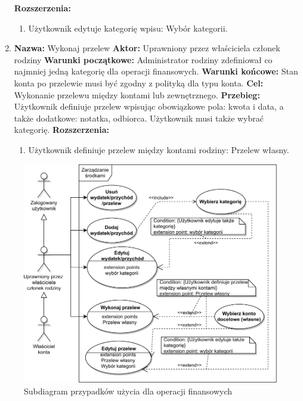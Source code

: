 \begin{enumerate}[labelwidth=1em,label=\arabic*.]
    \textbf{Rozszerzenia: } 
    \begin{enumerate}[label=\alph*)]
        \item Użytkownik edytuje kategorię wpisu: Wybór kategorii.
    \end{enumerate}
\item \textbf{Nazwa:} Wykonaj przelew \newline
    \textbf{Aktor:} Uprawniony przez właściciela członek rodziny \newline
    \textbf{Warunki początkowe:} Administrator rodziny zdefiniował co najmniej jedną kategorię dla operacji finansowych. \newline
    \textbf{Warunki końcowe:} Stan konta po przelewie musi być zgodny z polityką dla typu konta. \newline
    \textbf{Cel:} Wykonanie przelewu między kontami lub zewnętrznego. \newline
    \textbf{Przebieg:} Użytkownik definiuje przelew wpisując obowiązkowe pola: kwota i data, a także dodatkowe: notatka, odbiorca. Użytkownik musi także wybrać kategorię. \newline
    \textbf{Rozszerzenia: }
    \begin{enumerate}[label=\alph*)]
        \item Użytkownik definiuje przelew między kontami rodziny: Przelew własny.
    \end{enumerate}
\end{enumerate}

\begin{figure}[t]
	\centering
	\includegraphics[width=.7\linewidth]{rys03/use-case-money-2.pdf}
	\caption{Subdiagram przypadków użycia dla operacji finansowych}
	\label{fig:use-case-money}
\end{figure}

